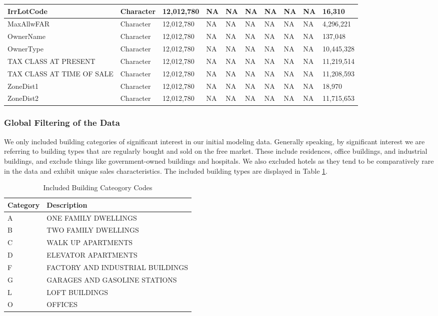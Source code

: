 \documentclass[conference,final,]{IEEEtran}
\begin{document}
\begin{table}
\begin{tabular}[t]{l|l|l|l|l|l|l|l|l|l}
\hline
IrrLotCode & Character & 12,012,780 & NA & NA & NA & NA & NA & NA & 16,310\\
\hline
MaxAllwFAR & Character & 12,012,780 & NA & NA & NA & NA & NA & NA & 4,296,221\\
\hline
OwnerName & Character & 12,012,780 & NA & NA & NA & NA & NA & NA & 137,048\\
\hline
OwnerType & Character & 12,012,780 & NA & NA & NA & NA & NA & NA & 10,445,328\\
\hline
TAX CLASS AT PRESENT & Character & 12,012,780 & NA & NA & NA & NA & NA & NA & 11,219,514\\
\hline
TAX CLASS AT TIME OF SALE & Character & 12,012,780 & NA & NA & NA & NA & NA & NA & 11,208,593\\
\hline
ZoneDist1 & Character & 12,012,780 & NA & NA & NA & NA & NA & NA & 18,970\\
\hline
ZoneDist2 & Character & 12,012,780 & NA & NA & NA & NA & NA & NA & 11,715,653\\
\hline
\end{tabular}
\end{table}

\hypertarget{global-filtering-of-the-data}{%
\subsubsection{Global Filtering of the
Data}\label{global-filtering-of-the-data}}

We only included building categories of significant interest in our
initial modeling data. Generally speaking, by significant interest we
are referring to building types that are regularly bought and sold on
the free market. These include residences, office buildings, and
industrial buildings, and exclude things like government-owned buildings
and hospitals. We also excluded hotels as they tend to be comparatively
rare in the data and exhibit unique sales characteristics. The included
building types are displayed in Table \ref{tab:categoryTable}.

\begin{table}

\caption{\label{tab:unnamed-chunk-6}\label{tab:categoryTable} Included Building Cateogory Codes}
\centering
\begin{tabular}[t]{l|l}
\hline
Category & Description\\
\hline
A & ONE FAMILY DWELLINGS\\
\hline
B & TWO FAMILY DWELLINGS\\
\hline
C & WALK UP APARTMENTS\\
\hline
D & ELEVATOR APARTMENTS\\
\hline
F & FACTORY AND INDUSTRIAL BUILDINGS\\
\hline
G & GARAGES AND GASOLINE STATIONS\\
\hline
L & LOFT BUILDINGS\\
\hline
O & OFFICES\\
\hline
\end{tabular}
\end{table}
\end{document}
